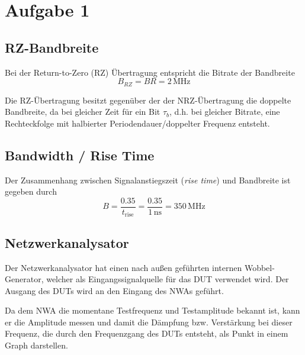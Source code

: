 \documentclass[a4paper, 12pt]{article}
\begin{document}

 \section{Aufgabe 1} 
 \subsection{RZ-Bandbreite}
 Bei der Return-to-Zero (RZ) Übertragung entspricht die Bitrate der Bandbreite
 \[B_{RZ} = BR = 2\, \si{\mega\hertz}\]

 Die RZ-Übertragung besitzt gegenüber der der NRZ-Übertragung die doppelte
 Bandbreite, da bei gleicher Zeit für ein Bit $\tau_b$, d.h. bei gleicher
 Bitrate, eine Rechteckfolge mit halbierter Periodendauer/doppelter Frequenz
entsteht.
 \begin{figure}[H]
 \begin{center}
   \resizebox{0.382\textwidth}{!}{}
 \end{center}
 \end{figure}



 \subsection{Bandwidth / Rise Time}
 Der Zusammenhang zwischen Signalanstiegszeit (\emph{rise time}) und Bandbreite ist gegeben durch
 \[B = \frac{0.35}{t_{\mathrm{rise}}} = \frac{0.35}{1 \, \si{\nano\second}} =
   350 \, \si{\mega\hertz}\]


\subsection{Netzwerkanalysator}
Der Netzwerkanalysator hat einen nach außen geführten internen Wobbel-Generator,
welcher als Eingangssignalquelle für das DUT verwendet wird. Der Ausgang des
DUTs wird an den Eingang des NWAs geführt.

Da dem NWA die momentane Testfrequenz und Testamplitude bekannt ist, kann er die
Amplitude messen und damit die Dämpfung bzw. Verstärkung bei dieser Frequenz, die durch den Frequenzgang des DUTs entsteht, als Punkt in
einem Graph darstellen.
\end{document}
